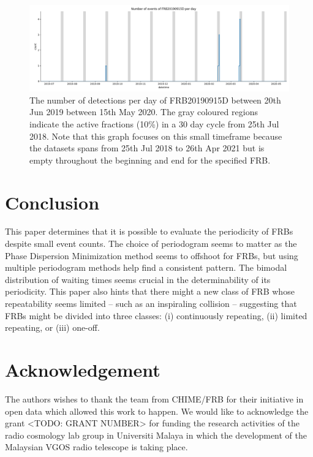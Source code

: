 \documentclass[
  rmp,
  amsmath,
  amssymb,
  preprint]{revtex4-2}
\begin{document}
\begin{figure}

{\centering \includegraphics{./img/FRB20190915D-countplot.png}

}

\caption{\label{fig-FRB20190915D-countplot}The number of detections per
day of FRB20190915D between 20th Jun 2019 between 15th May 2020. The
gray coloured regions indicate the active fractions (10\%) in a 30 day
cycle from 25th Jul 2018. Note that this graph focuses on this small
timeframe because the datasets spans from 25th Jul 2018 to 26th Apr 2021
but is empty throughout the beginning and end for the specified FRB.}

\end{figure}

\hypertarget{conclusion}{%
\section{Conclusion}\label{conclusion}}

This paper determines that it is possible to evaluate the periodicity of
FRBs despite small event counts. The choice of periodogram seems to
matter as the Phase Dispersion Minimization method seems to offshoot for
FRBs, but using multiple periodogram methods help find a consistent
pattern. The bimodal distribution of waiting times seems crucial in the
determinability of its periodicity. This paper also hints that there
might a new class of FRB whose repeatability seems limited -- such as an
inspiraling collision -- suggesting that FRBs might be divided into
three classes: (i) continuously repeating, (ii) limited repeating, or
(iii) one-off.

\hypertarget{acknowledgement}{%
\section{Acknowledgement}\label{acknowledgement}}

The authors wishes to thank the team from CHIME/FRB for their initiative
in open data which allowed this work to happen. We would like to
acknowledge the grant \textless TODO: GRANT NUMBER\textgreater{} for
funding the research activities of the radio cosmology lab group in
Universiti Malaya in which the development of the Malaysian VGOS radio
telescope is taking place.
\end{document}
